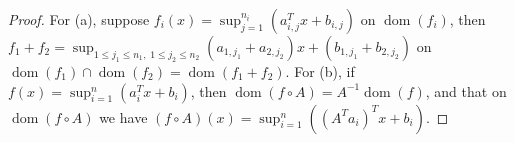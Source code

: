 \begin{proof}
	For (a), suppose $f_i(x)=\sup_{j=1}^{n_i}(a_{i,j}^Tx+b_{i,j})$ on $\operatorname{dom}(f_i)$, then $f_1+f_2=\sup_{1\leq j_1\leq n_1,\; 1\leq j_2\leq n_2}(a_{1,j_1}+a_{2,j_2})x+(b_{1,j_1}+b_{2,j_2})$ on $\operatorname{dom}(f_1)\cap \operatorname{dom}(f_2)=\operatorname{dom}(f_1+f_2)$. For (b), if $f(x)=\sup_{i=1}^{n}(a_{i}^Tx+b_{i})$, then $\operatorname{dom}(f\circ A)=A^{-1}\operatorname{dom}(f)$, and that on $\operatorname{dom}(f\circ A)$ we have $(f\circ A)(x)=\sup_{i=1}^{n}((A^Ta_{i})^Tx+b_{i})$.
\end{proof}
